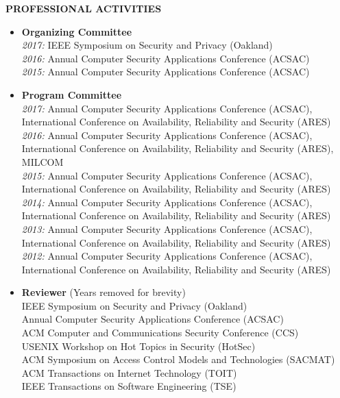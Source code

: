 \documentclass[10pt]{article}
\begin{document}
\vspace{1em} {\large \textbf{PROFESSIONAL ACTIVITIES}}
\begin{itemize}
  \item \textbf{Organizing Committee}\\
    \textit{2017:} IEEE Symposium on Security and Privacy (Oakland)\\
    \textit{2016:} Annual Computer Security Applications Conference (ACSAC)\\
    \textit{2015:} Annual Computer Security Applications Conference (ACSAC)
  \item \textbf{Program Committee}\\
    \textit{2017:} Annual Computer Security Applications Conference (ACSAC), International Conference on Availability, Reliability and Security (ARES)\\
    \textit{2016:} Annual Computer Security Applications Conference (ACSAC), International Conference on Availability, Reliability and Security (ARES), MILCOM\\
    \textit{2015:} Annual Computer Security Applications Conference (ACSAC), International Conference on Availability, Reliability and Security (ARES)\\
    \textit{2014:} Annual Computer Security Applications Conference (ACSAC), International Conference on Availability, Reliability and Security (ARES)\\
    \textit{2013:} Annual Computer Security Applications Conference (ACSAC), International Conference on Availability, Reliability and Security (ARES)\\
    \textit{2012:} Annual Computer Security Applications Conference (ACSAC), International Conference on Availability, Reliability and Security (ARES)\\
  \item \textbf{Reviewer} (Years removed for brevity)\\
    IEEE Symposium on Security and Privacy (Oakland)\\
    Annual Computer Security Applications Conference (ACSAC)\\
    ACM Computer and Communications Security Conference (CCS)\\
    USENIX Workshop on Hot Topics in Security (HotSec)\\
    ACM Symposium on Access Control Models and Technologies (SACMAT)\\
    ACM Transactions on Internet Technology (TOIT)\\
    IEEE Transactions on Software Engineering (TSE)\\

\end{itemize}
\end{document}
